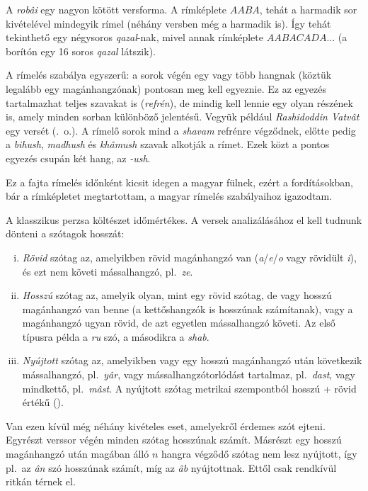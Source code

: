 A \emph{robâi} egy nagyon kötött versforma. A rímképlete $AABA$, tehát
a harmadik sor kivételével mindegyik rímel (néhány versben még a
harmadik is). Így tehát tekinthető egy négysoros \emph{qazal}-nak,
mivel annak rímképlete $AABACADA\dots$ (a borítón egy 16 soros
\emph{qazal} látszik).

A rímelés szabálya egyszerű: a sorok végén egy vagy több hangnak
(köztük legalább egy magánhangzónak)
pontosan meg kell egyeznie. Ez az egyezés tartalmazhat teljes szavakat
is (\emph{refrén}), de mindig kell lennie egy olyan részének is, amely
minden sorban különböző jelentésű. Vegyük például \emph{Rashidoddin
Vatvât} egy versét (\pageref{Vatvat}.~o.). A rímelő sorok mind
a \emph{shavam} refrénre végződnek, előtte pedig a \emph{bihush},
\emph{madhush} és \emph{khâmush} szavak alkotják a rímet. Ezek közt a
pontos egyezés csupán két hang, az \emph{-ush}.

Ez a fajta rímelés időnként kicsit idegen a magyar fülnek, ezért a
fordításokban, bár a rímképletet megtartottam, a magyar rímelés
szabályaihoz igazodtam.

A klasszikus perzsa költészet időmértékes. A versek analizálásához
el kell tudnunk dönteni a szótagok hosszát:

\begin{enumerate}[i)]
  \item \emph{Rövid} szótag az, amelyikben rövid magánhangzó van
    (\emph{a}/\emph{e}/\emph{o} vagy rövidült \emph{i}), és ezt nem
    követi mássalhangzó, pl.~\emph{ze}.
  \item \emph{Hosszú} szótag az, amelyik olyan, mint egy rövid szótag, de
    vagy hosszú magánhangzó van benne (a kettőshangzók is hosszúnak
    számítanak), vagy a magánhangzó ugyan rövid, de azt egyetlen mássalhangzó
    követi. Az első típusra példa a \emph{ru} szó, a másodikra a
    \emph{shab}.
  \item \emph{Nyújtott} szótag az, amelyikben vagy egy hosszú magánhangzó
    után következik mássalhangzó, pl.~\emph{yâr}, vagy
    mássalhangzótorlódást tartalmaz, pl.~\emph{dast}, vagy mindkettő,
    pl.~\emph{mâst}. A nyújtott szótag metrikai szempontból hosszú +
    rövid értékű (\metra{\m\b}).
\end{enumerate}

Van ezen kívül még néhány kivételes eset, amelyekről érdemes szót ejteni.
Egyrészt verssor végén minden szótag hosszúnak számít.
Másrészt egy hosszú magánhangzó után magában álló $n$ hangra végződő
szótag nem lesz nyújtott, így pl.~az \emph{ân} szó hosszúnak számít, míg
az \emph{âb} nyújtottnak. Ettől csak rendkívül ritkán térnek el.

